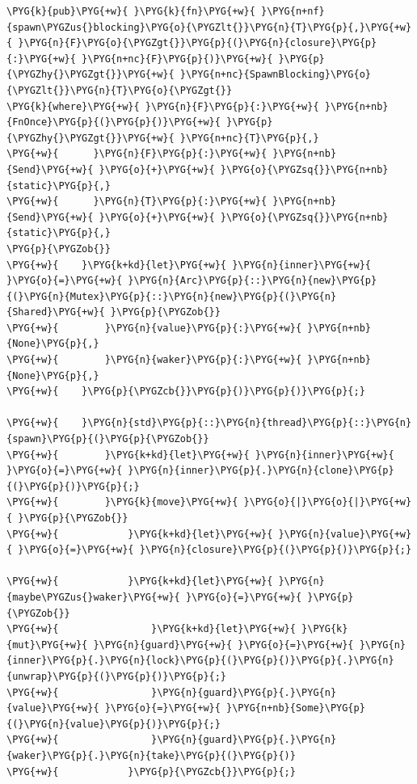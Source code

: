 \begin{Verbatim}[commandchars=\\\{\},breaklines=true,breakanywhere=true,fontsize=\codefont,xleftmargin=17bp]
\PYG{k}{pub}\PYG{+w}{ }\PYG{k}{fn}\PYG{+w}{ }\PYG{n+nf}{spawn\PYGZus{}blocking}\PYG{o}{\PYGZlt{}}\PYG{n}{T}\PYG{p}{,}\PYG{+w}{ }\PYG{n}{F}\PYG{o}{\PYGZgt{}}\PYG{p}{(}\PYG{n}{closure}\PYG{p}{:}\PYG{+w}{ }\PYG{n+nc}{F}\PYG{p}{)}\PYG{+w}{ }\PYG{p}{\PYGZhy{}\PYGZgt{}}\PYG{+w}{ }\PYG{n+nc}{SpawnBlocking}\PYG{o}{\PYGZlt{}}\PYG{n}{T}\PYG{o}{\PYGZgt{}}
\PYG{k}{where}\PYG{+w}{ }\PYG{n}{F}\PYG{p}{:}\PYG{+w}{ }\PYG{n+nb}{FnOnce}\PYG{p}{(}\PYG{p}{)}\PYG{+w}{ }\PYG{p}{\PYGZhy{}\PYGZgt{}}\PYG{+w}{ }\PYG{n+nc}{T}\PYG{p}{,}
\PYG{+w}{      }\PYG{n}{F}\PYG{p}{:}\PYG{+w}{ }\PYG{n+nb}{Send}\PYG{+w}{ }\PYG{o}{+}\PYG{+w}{ }\PYG{o}{\PYGZsq{}}\PYG{n+nb}{static}\PYG{p}{,}
\PYG{+w}{      }\PYG{n}{T}\PYG{p}{:}\PYG{+w}{ }\PYG{n+nb}{Send}\PYG{+w}{ }\PYG{o}{+}\PYG{+w}{ }\PYG{o}{\PYGZsq{}}\PYG{n+nb}{static}\PYG{p}{,}
\PYG{p}{\PYGZob{}}
\PYG{+w}{    }\PYG{k+kd}{let}\PYG{+w}{ }\PYG{n}{inner}\PYG{+w}{ }\PYG{o}{=}\PYG{+w}{ }\PYG{n}{Arc}\PYG{p}{::}\PYG{n}{new}\PYG{p}{(}\PYG{n}{Mutex}\PYG{p}{::}\PYG{n}{new}\PYG{p}{(}\PYG{n}{Shared}\PYG{+w}{ }\PYG{p}{\PYGZob{}}
\PYG{+w}{        }\PYG{n}{value}\PYG{p}{:}\PYG{+w}{ }\PYG{n+nb}{None}\PYG{p}{,}
\PYG{+w}{        }\PYG{n}{waker}\PYG{p}{:}\PYG{+w}{ }\PYG{n+nb}{None}\PYG{p}{,}
\PYG{+w}{    }\PYG{p}{\PYGZcb{}}\PYG{p}{)}\PYG{p}{)}\PYG{p}{;}

\PYG{+w}{    }\PYG{n}{std}\PYG{p}{::}\PYG{n}{thread}\PYG{p}{::}\PYG{n}{spawn}\PYG{p}{(}\PYG{p}{\PYGZob{}}
\PYG{+w}{        }\PYG{k+kd}{let}\PYG{+w}{ }\PYG{n}{inner}\PYG{+w}{ }\PYG{o}{=}\PYG{+w}{ }\PYG{n}{inner}\PYG{p}{.}\PYG{n}{clone}\PYG{p}{(}\PYG{p}{)}\PYG{p}{;}
\PYG{+w}{        }\PYG{k}{move}\PYG{+w}{ }\PYG{o}{|}\PYG{o}{|}\PYG{+w}{ }\PYG{p}{\PYGZob{}}
\PYG{+w}{            }\PYG{k+kd}{let}\PYG{+w}{ }\PYG{n}{value}\PYG{+w}{ }\PYG{o}{=}\PYG{+w}{ }\PYG{n}{closure}\PYG{p}{(}\PYG{p}{)}\PYG{p}{;}

\PYG{+w}{            }\PYG{k+kd}{let}\PYG{+w}{ }\PYG{n}{maybe\PYGZus{}waker}\PYG{+w}{ }\PYG{o}{=}\PYG{+w}{ }\PYG{p}{\PYGZob{}}
\PYG{+w}{                }\PYG{k+kd}{let}\PYG{+w}{ }\PYG{k}{mut}\PYG{+w}{ }\PYG{n}{guard}\PYG{+w}{ }\PYG{o}{=}\PYG{+w}{ }\PYG{n}{inner}\PYG{p}{.}\PYG{n}{lock}\PYG{p}{(}\PYG{p}{)}\PYG{p}{.}\PYG{n}{unwrap}\PYG{p}{(}\PYG{p}{)}\PYG{p}{;}
\PYG{+w}{                }\PYG{n}{guard}\PYG{p}{.}\PYG{n}{value}\PYG{+w}{ }\PYG{o}{=}\PYG{+w}{ }\PYG{n+nb}{Some}\PYG{p}{(}\PYG{n}{value}\PYG{p}{)}\PYG{p}{;}
\PYG{+w}{                }\PYG{n}{guard}\PYG{p}{.}\PYG{n}{waker}\PYG{p}{.}\PYG{n}{take}\PYG{p}{(}\PYG{p}{)}
\PYG{+w}{            }\PYG{p}{\PYGZcb{}}\PYG{p}{;}


\end{Verbatim}
